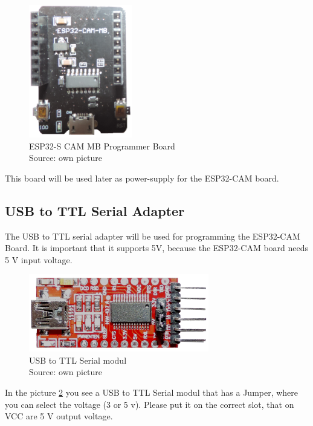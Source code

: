 \begin{figure}[H]
\centering
\includegraphics[width=0.4\textwidth]{ESP32-CAM-MB-programmer}
\caption[ESP32-S CAM MB Programmer Board]{ESP32-S CAM MB Programmer Board \\ Source: own picture}
\label{ESP32-S-CAM-overview}
\end{figure}

This board will be used later as power-supply for the ESP32-CAM board.

\subsection{USB to TTL Serial Adapter}
The USB to TTL serial adapter will be used for programming the ESP32-CAM Board.
It is important that it supports 5V, because the ESP32-CAM board needs 5 V input voltage.

\begin{figure}[H]
\centering
\includegraphics[width=0.7\textwidth]{usb-ttl_serial}
\caption[USB to TTL Serial modul]{USB to TTL Serial modul \\ Source: own picture}
\label{USB-to-TTL-Serial}
\end{figure}

In the picture \ref{USB-to-TTL-Serial} you see a USB to TTL Serial modul that has a Jumper, where you can select the voltage (3 or 5 v). Please put it on the correct slot, that on VCC are 5 V output voltage. 

